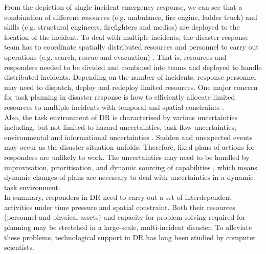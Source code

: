 From the depiction of single incident emergency response, we can see that a combination of different resources (e.g. ambulance, fire engine, ladder truck) and skills (e.g. structural engineers, firefighters and medics) are deployed to the location of the incident. To deal with multiple incidents, the disaster response team has to coordinate spatially distributed resources and personnel to carry out operations (e.g. search, rescue and evacuation) \citep{Chen2005}. That is, resources and responders needed to be divided and combined into teams and deployed to handle distributed incidents. Depending on the number of incidents, response personnel may need to dispatch, deploy and redeploy limited resources. One major concern for task planning in disaster response is how to efficiently allocate limited resources to multiple incidents with temporal and spatial constraints \citep{Bradshaw2011}.\\

Also, the task environment of \ac{DR} is characterised by various uncertainties including, but not limited to hazard uncertainties, task-flow uncertainties, environmental and informational uncertainties \citep{Chen2008}. Sudden and unexpected events may occur as the disaster situation unfolds. Therefore, fixed plans of actions for responders are unlikely to work. The uncertainties may need to be handled by improvisation, prioritisation, and dynamic sourcing of capabilities \citep{Faraj2006}, which means dynamic changes of plans are necessary to deal with uncertainties in a dynamic task environment.\\   

In summary, responders in \ac{DR} need to carry out a set of interdependent activities under time pressure and spatial constraint. Both their resources (personnel and physical assets) and capacity for problem solving required for planning may be stretched in a large-scale, multi-incident disaster. To alleviate these problems, technological support in \ac{DR} has long been studied by computer scientists.\\ 




